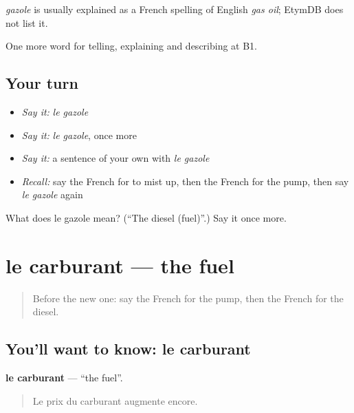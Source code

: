 \begin{cousinweb}
\emph{gazole} is usually explained as a French spelling of English \emph{gas oil}; EtymDB does not list it.
\end{cousinweb}

\begin{grammarlens}[title={What you've built}]
One more word for telling, explaining and describing at B1.
\end{grammarlens}

\subsection*{Your turn}
\begin{itemize}
\raggedright
  \item \emph{Say it:} \emph{le gazole}
  \item \emph{Say it:} \emph{le gazole}, once more
  \item \emph{Say it:} a sentence of your own with \emph{le gazole}
  \item \emph{Recall:} say the French for to mist up, then the French for the pump, then say \emph{le gazole} again
\end{itemize}

\begin{tcolorbox}[breakable,colback=teal!4,colframe=teal!35!black,title={Before you move on}]
What does le gazole mean? (\textquotedblleft{}The diesel (fuel)\textquotedblright{}.) Say it once more.
\end{tcolorbox}
\section[le carburant]{le carburant — the fuel}

\label{lesson:FR-C403-carburant}



\begin{quote}
Before the new one: say the French for the pump, then the French for the diesel.
\end{quote}

\subsection*{You'll want to know: le carburant}
\textbf{le carburant} — \textquotedblleft{}the fuel\textquotedblright{}.

\begin{quote}
Le prix du carburant augmente encore.
\end{quote}

